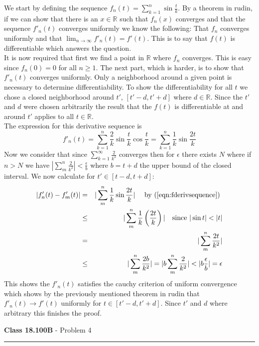 \documentclass[11pt,reqno]{article}
\begin{document}
 We start by defining the sequence $f_n(t) = \sum_{k = 1}^n \sin \frac{t}{k}$.  By a theorem in rudin, if we can show that there is an $x \in \mathbb{R}$ such that $f_n(x)$ converges and that the sequence $f'_n(t)$ converges uniformly we know the following: That $f_n$ converges uniformly and that $\lim_{n \to \infty} f'_n(t) = f'(t)$. This is to say that $f(t)$ is differentiable which answers the question.\\
\indent It is now required that first we find a point in $\mathbb{R}$ where $f_n$ converges. This is easy since $f_n(0) = 0$ for all $n \ge 1$. The next part, which is harder, is to show that $f'_n(t)$ converges uniformly.  Only a neighborhood around a given point is necessary to determine differentiability. To show the differentiability for all $t$ we chose a closed neighborhood around $t'$, $[t'-d,t'+d]$ where $d \in \mathbb{R}$. Since the $t'$ and $d$ were chosen arbitrarily the result that the $f(t)$ is differentiable at and around $t'$ applies to all $t \in \mathbb{R}$.\\
\indent The expression for this derivative sequence is
\begin{equation}
 f'_n(t) = \sum_{k=1}^n \frac{2}{k} \sin \frac{t}{k} \cos \frac{t}{k} = \sum_{k=1}^n \frac{1}{k} \sin \frac{2t}{k} \label{eqn:fderivsequence}
\end{equation}
Now we consider that since $\sum_{k=1}^\infty \frac{2}{k^2}$ converges then for $\epsilon$ there exists $N$ where if $n > N$ we have $|\sum_m^n \frac{2}{k^2}| < \frac{\epsilon}{b}$ where $b = t+d$ the upper bound of the closed interval. We now calculate for $t' \in [t-d,t+d]$:
\begin{eqnarray*}
|f'_n(t) - f'_m(t)| &=& |\sum_m^n \frac{1}{k} \sin \frac{2t}{k}| \quad \text{ by ($\ref{eqn:fderivsequence}$) } \\
			&\le& |\sum_m^n \frac{1}{k} \left( \frac{2t}{k} \right) | \quad \text{since $|\sin t| < |t|$}\\
			&=& |\sum_m^n \frac{2t}{k^2} | \\
			&\le& |\sum_m^n \frac{2b}{k^2} |  = |b \sum_m^n \frac{2}{k^2} | < |b \frac{\epsilon}{b}| = \epsilon\\
\end{eqnarray*}
This shows the $f'_n(t)$ satisfies the cauchy criterion of uniform convergence which shows by the previously mentioned theorem in rudin that $f'_n(t) \to f'(t)$ uniformly for $t \in [t'-d,t'+d]$. Since $t'$ and $d$ where arbitrary this finishes the proof. 
 
\vspace{15pt}
\begin{flushleft} 
\textbf{Class 18.100B} - Problem 4\\
\rule{500pt}{1pt}\\
\end{flushleft} 
\end{document}
